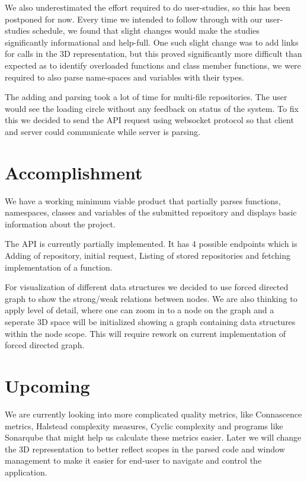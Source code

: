 We also underestimated the effort required to do user-studies, so this has been postponed for now. Every time we intended to follow through with our user-studies schedule, we found that slight changes would make the studies significantly informational and help-full. One such slight change was to add links for calls in the 3D representation, but this proved significantly more difficult than expected as to identify overloaded functions and class member functions, we were required to also parse name-spaces and variables with their types.

The adding and parsing took a lot of time for multi-file repositories. The user would see the loading circle without any feedback on status of the system. To fix this we decided to send the API request using websocket protocol so that client and server could communicate while server is parsing.

\section*{Accomplishment}
We have a working minimum viable product that partially parses functions, namespaces, classes and variables of the submitted repository and displays basic information about the project. 

The API is currently partially implemented. It has 4 possible endpoints which is Adding of repository, initial request, Listing of stored repositories and fetching implementation of a function.

For visualization of different data structures we decided to use forced directed graph to show the strong/weak relations between nodes. We are also thinking to apply level of detail, where one can zoom in to a node on the graph and a seperate 3D space will be initialized showing a graph containing data structures within the node scope. This will require rework on current implementation of forced directed graph.

\section*{Upcoming}
We are currently looking into more complicated quality metrics, like Connascence metrics, Halstead complexity measures, Cyclic complexity and programs like Sonarqube that might help us calculate these metrics easier.
Later we will change the 3D representation to better reflect scopes in the parsed code and window management to make it easier for end-user to navigate and control the application. 
\newpage